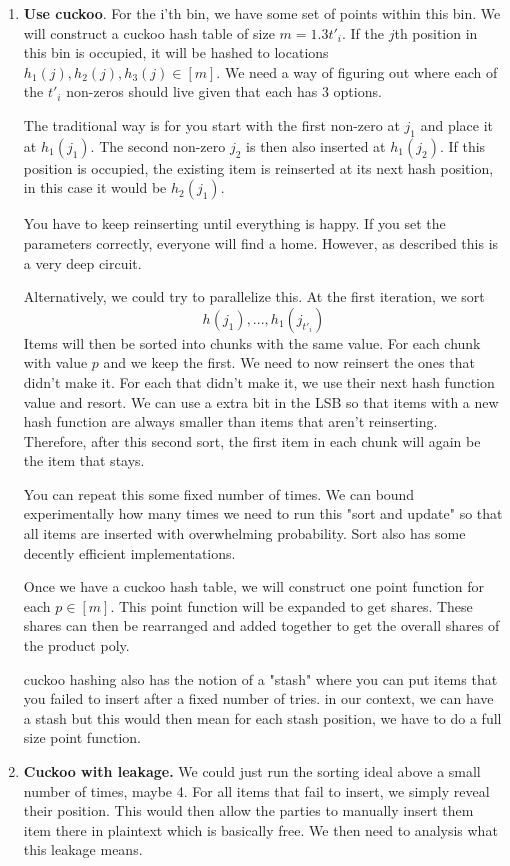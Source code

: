 \begin{enumerate}
  \item \textbf{Use cuckoo}. For the i'th bin, we have some set of points within this bin. We will construct a cuckoo hash table of size $m=1.3t'_i$. If the $j$th position in this bin is occupied, it will be hashed to locations $h_1(j),h_2(j),h_3(j)\in [m]$. We need a way of figuring out where each of the $t'_i$ non-zeros should live given that each has 3 options.

    The traditional way is for you start with the first non-zero at $j_1$ and place it at $h_1(j_1)$. The second non-zero $j_2$ is then also inserted at $h_1(j_2)$. If this position is occupied, the existing item is reinserted at its next hash position, in this case it would be $h_2(j_1)$.

    You have to keep reinserting until everything is happy. If you set the parameters correctly,  everyone will find a home. However, as described this is a very deep circuit.

    Alternatively, we could try to parallelize this. At the first iteration, we sort
    $$
    h(j_1),...,h_1(j_{t'_i})
    $$
    Items will then be sorted into chunks with the same value. For each chunk with value $p$ and we keep the first. We need to now reinsert the ones that didn't make it. For each that didn't make it, we use their next hash function value and resort. We can use a extra bit in the LSB so that items with a new hash function are always smaller than items that aren't reinserting. Therefore, after this second sort, the first item in each chunk will again be the item that stays.

    You can repeat this some fixed number of times. We can bound experimentally how many times we need to run this "sort and update" so that all items are inserted with overwhelming probability. Sort also has some decently efficient implementations.

    Once we have a cuckoo hash table, we will construct one point function for each $p\in[m]$. This point function will be expanded to get shares. These shares can then be rearranged and added together to get the overall shares of the product poly.

    cuckoo hashing also has the notion of a "stash" where you can put items that you failed to insert after a fixed number of tries. in our context, we can have a stash but this would then mean for each stash position, we have to do a full size point function.

  \item \textbf{Cuckoo with leakage.} We could just run the sorting ideal above a small number of times, maybe 4. For all items that fail to insert, we simply reveal their position. This would then allow the parties to manually insert them item there in plaintext which is basically free. We then need to analysis what this leakage means.


\end{enumerate}
